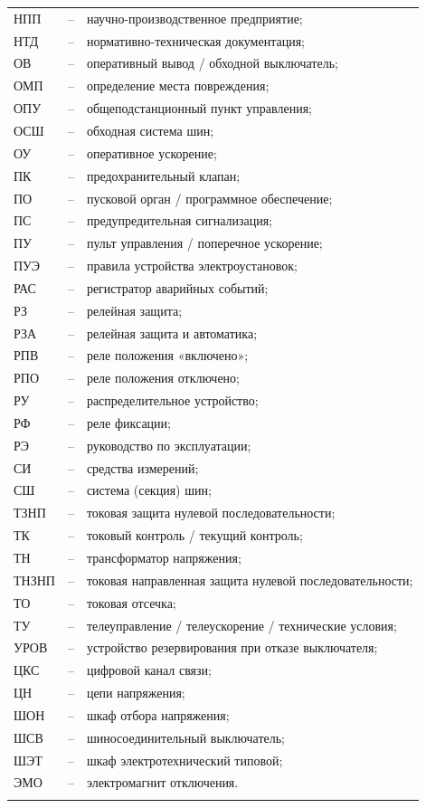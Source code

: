 \begin{longtable}{>{\raggedright\arraybackslash}m{2cm}>{\raggedright\arraybackslash}m{0.5cm}>{\raggedright\arraybackslash}m{20cm}}
НПП & -- & научно-производственное предприятие; \\
НТД & -- & нормативно-техническая документация; \\
ОВ & -- & оперативный вывод / обходной выключатель; \\
ОМП & -- & определение места повреждения; \\
ОПУ & -- & общеподстанционный пункт управления; \\
ОСШ & -- & обходная система шин; \\
ОУ & -- & оперативное ускорение; \\
ПК & -- & предохранительный клапан; \\
ПО & -- & пусковой орган / программное обеспечение; \\
ПС & -- & предупредительная сигнализация; \\
ПУ & -- & пульт управления / поперечное ускорение; \\
ПУЭ & -- & правила устройства электроустановок; \\
РАС & -- & регистратор аварийных событий; \\
РЗ & -- & релейная защита; \\
РЗА & -- & релейная защита и автоматика; \\
РПВ & -- & реле положения «включено»; \\
РПО & -- & реле положения отключено; \\
РУ & -- & распределительное устройство; \\
РФ & -- & реле фиксации; \\
РЭ & -- & руководство по эксплуатации; \\
СИ & -- & средства измерений; \\
СШ & -- & система (секция) шин; \\
ТЗНП & -- & токовая защита нулевой последовательности; \\
ТК & -- & токовый контроль / текущий контроль; \\
ТН & -- & трансформатор напряжения; \\
ТНЗНП & -- & токовая направленная защита нулевой последовательности; \\
ТО & -- & токовая отсечка; \\
ТУ & -- & телеуправление / телеускорение / технические условия; \\
УРОВ & -- & устройство резервирования при отказе выключателя; \\
ЦКС & -- & цифровой канал связи; \\
ЦН & -- & цепи напряжения; \\
ШОН & -- & шкаф отбора напряжения; \\
ШСВ & -- & шиносоединительный выключатель; \\
ШЭТ & -- & шкаф электротехнический типовой; \\
ЭМО & -- & электромагнит отключения. \\
{\color{white}\fontsize{0.1pt}{0.1pt}\selectfont<endABBRS>}
\end{longtable}
